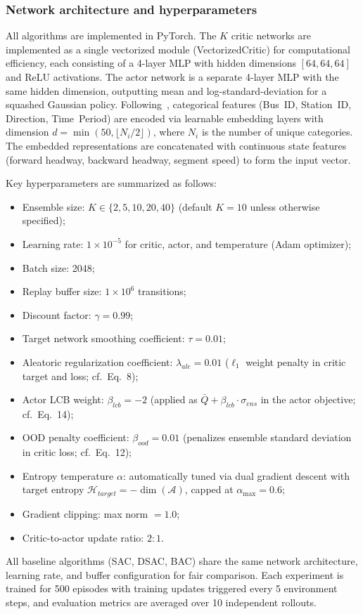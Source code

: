 \documentclass[10pt]{article}
\begin{document}
\subsubsection{Network architecture and hyperparameters}
All algorithms are implemented in PyTorch. The $K$ critic networks are implemented as a single vectorized module (VectorizedCritic) for computational efficiency, each consisting of a 4-layer MLP with hidden dimensions $[64, 64, 64]$ and ReLU activations. The actor network is a separate 4-layer MLP with the same hidden dimension, outputting mean and log-standard-deviation for a squashed Gaussian policy. Following~\cite{Zhang2025SingleAgentBus}, categorical features (Bus~ID, Station~ID, Direction, Time~Period) are encoded via learnable embedding layers with dimension $d = \min(50, \lfloor N_i / 2 \rfloor)$, where $N_i$ is the number of unique categories. The embedded representations are concatenated with continuous state features (forward headway, backward headway, segment speed) to form the input vector.

Key hyperparameters are summarized as follows:
\begin{itemize}
    \item Ensemble size: $K \in \{2, 5, 10, 20, 40\}$ (default $K = 10$ unless otherwise specified);
    \item Learning rate: $1 \times 10^{-5}$ for critic, actor, and temperature (Adam optimizer);
    \item Batch size: 2048;
    \item Replay buffer size: $1 \times 10^6$ transitions;
    \item Discount factor: $\gamma = 0.99$;
    \item Target network smoothing coefficient: $\tau = 0.01$;
    \item Aleatoric regularization coefficient: $\lambda_{ale} = 0.01$ ($\ell_1$ weight penalty in critic target and loss; cf.\ Eq.~8);
    \item Actor LCB weight: $\beta_{lcb} = -2$ (applied as $\bar{Q} + \beta_{lcb} \cdot \sigma_{ens}$ in the actor objective; cf.\ Eq.~14);
    \item OOD penalty coefficient: $\beta_{ood} = 0.01$ (penalizes ensemble standard deviation in critic loss; cf.\ Eq.~12);
    \item Entropy temperature $\alpha$: automatically tuned via dual gradient descent with target entropy $\mathcal{H}_{target} = -\dim(\mathcal{A})$, capped at $\alpha_{\max} = 0.6$;
    \item Gradient clipping: max norm $= 1.0$;
    \item Critic-to-actor update ratio: $2:1$.
\end{itemize}
All baseline algorithms (SAC, DSAC, BAC) share the same network architecture, learning rate, and buffer configuration for fair comparison. Each experiment is trained for 500 episodes with training updates triggered every 5 environment steps, and evaluation metrics are averaged over 10 independent rollouts.
\end{document}
